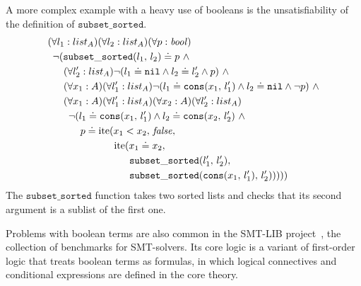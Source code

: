 A more complex example with a heavy use of booleans is the unsatisfiability of the definition of $\mathtt{subset\_sorted}$.
\begin{gather}\label{formula:subset-sorted}
\begin{aligned}
&(\forall{{l_1}:{list_A}})(\forall{{l_2}:{list_A}})(\forall{{p}:{\mathit{bool}}}) \\
&\hspace{0.5em}\neg (\mathtt{subset\_sorted}(l_1,\,l_2) \doteq p ~\wedge \\
&\hspace{1.6em}      (\forall{{l_2'}:{list_A}})\neg (l_1 \doteq \mathtt{nil} \wedge l_2 \doteq l_2' \wedge p) ~\wedge \\
&\hspace{1.6em}      (\forall{{x_1}:{A}})(\forall{{l_1'}:{list_A}})\neg (l_1 \doteq \mathtt{cons}(x_1,\,l_1') \wedge l_2 \doteq \mathtt{nil} \wedge \neg p) ~\wedge \\
&\hspace{1.6em}      (\forall{{x_1}:{A}})(\forall{{l_1'}:{list_A}})(\forall{{x_2}:{A}})(\forall{{l_2'}:{list_A}}) \\
&\hspace{2.1em}       \neg (l_1 \doteq \mathtt{cons}(x_1,\,l_1') \wedge l_2 \doteq \mathtt{cons}(x_2,\,l_2') ~\wedge \\
&\hspace{3.3em}       p \doteq \mathrm{ite}(x_1 < x_2,\,\mathit{false},\\
&\hspace{6.7em}                             \mathrm{ite}(x_1 \doteq x_2,\\
&\hspace{8.25em}                                        \mathtt{subset\_sorted}(l_1',\,l_2'), \\
&\hspace{8.25em}                                        \mathtt{subset\_sorted}(\mathtt{cons}(x_1,\,l_1'),\,l_2')))))
\end{aligned}
\end{gather}
The $\mathtt{subset\_sorted}$ function takes two sorted lists and checks that its second argument is a sublist of the first one.

Problems with boolean terms are also common in the SMT-LIB project~\cite{SMT-LIB}, the collection of benchmarks for SMT-solvers. Its core logic is a variant of first-order logic that treats boolean terms as formulas, in which logical connectives and conditional expressions are defined in the core theory.

